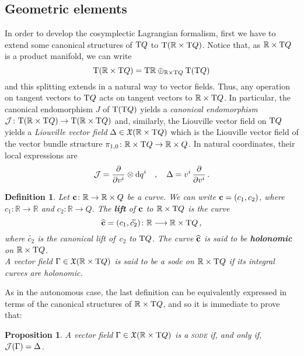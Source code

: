 \documentclass[12pt]{report}
\newtheorem{prop}[teor]{Proposition}
\newtheorem{definition}[teor]{Definition}
\def\vf{\mathfrak X}
\def\d{{\rm d}}
\def\Real{\mathbb{R}}
\def\Tan{{\rm T}}
\begin{document}
\subsection{Geometric elements}
\label{geomRxTQ}


In order to develop the cosymplectic Lagrangian formalism, first
we have to extend some canonical structures of
$\Tan Q$ to $\Tan(\Real\times\Tan Q)$.
Notice that, as $\Real\times\Tan Q$ is a product manifold, we can write
$$
\Tan(\Real\times\Tan Q) =\Tan\Real\oplus_{\Real\times\Tan Q}
\Tan(\Tan Q)
$$
and this splitting extends in a natural way to vector fields.
Thus, any operation on tangent vectors to $\Tan Q$
acts on tangent vectors to $\Real\times\Tan Q$.
In particular, the canonical endomorphism $J$
of $\Tan(\Tan Q)$ yields a \textsl{canonical endomorphism}
${\cal J} \colon \Tan (\Real\times\Tan Q) \to \Tan (\Real\times\Tan Q)$ and,
similarly, the Liouville vector field on $\Tan Q$
yields a \textsl{Liouville vector field}
$\Delta \in \vf(\Real\times\Tan Q)$ which is the Liouville vector field 
of the vector bundle structure $\pi_{1,0}\colon\Real\times\Tan Q\to\Real\times Q$.
In natural coordinates, their local expressions are
$$
{\cal J} =
\frac{\partial}{\partial v^i} \otimes \d q^i
\quad ,\quad
\Delta = 
v^i\, \frac{\partial}{\partial v^i}
\,.
$$

\begin{definition}
\label{de652}
Let  ${\bf c} \colon\Real \rightarrow \Real\times Q$ be a curve.
We can write ${\bf c} = (c_1,c_2)$, where
$c_1 \colon\Real \rightarrow \Real$ and $c _2\colon\Real \rightarrow Q$.
The \textbf{lift} of ${\bf c}$ 
to $\Real\times\Tan Q$ is the curve
$$
\widehat{\bf c}=(c_1,\widetilde{c_2})\colon\Real \longrightarrow \Real\times\Tan Q  \,,
$$
where $\widetilde{c_2}$ is the canonical lift of~$c_2$ to $\Tan Q$.
The curve $\widehat{\bf c}$ is said to be \textbf{holonomic} on $\Real\times\Tan Q$.
\\
A vector field  $\Gamma \in \vf(\Real\times\Tan Q)$ 
is said to be a  {\sc sode} on $\Real\times\Tan Q$ if its integral curves are holonomic. 
\end{definition}

As in the autonomous case, the last definition can be 
equivalently expressed in terms of the canonical structures of
$\Real\times\Tan Q$, and so it is immediate to prove that:

\begin{prop}
A vector field $\Gamma \in\vf(\Real\times\Tan Q)$ 
is a \textsc{sode} if, and only if,
${\cal J}(\Gamma) = \Delta$.
\end{prop}
\end{document}
